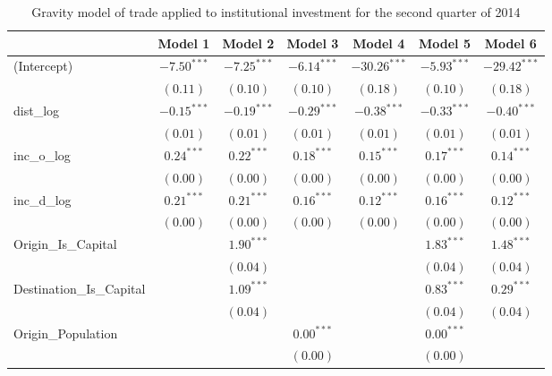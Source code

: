 \begin{table}
	\small
	\begin{center}
		\caption[Gravity Model of Trade for Q2 2014]{Gravity model of trade applied to institutional investment for the second quarter of 2014}
		
		\begin{tabular}{l c c c c c c }
			\hline
			& Model 1 & Model 2 & Model 3 & Model 4 & Model 5 & Model 6 \\
			\hline
			(Intercept)                  & $-7.50^{***}$ & $-7.25^{***}$ & $-6.14^{***}$ & $-30.26^{***}$ & $-5.93^{***}$ & $-29.42^{***}$ \\
			& $(0.11)$      & $(0.10)$      & $(0.10)$      & $(0.18)$       & $(0.10)$      & $(0.18)$       \\
			dist\_log                    & $-0.15^{***}$ & $-0.19^{***}$ & $-0.29^{***}$ & $-0.38^{***}$  & $-0.33^{***}$ & $-0.40^{***}$  \\
			& $(0.01)$      & $(0.01)$      & $(0.01)$      & $(0.01)$       & $(0.01)$      & $(0.01)$       \\
			inc\_o\_log                  & $0.24^{***}$  & $0.22^{***}$  & $0.18^{***}$  & $0.15^{***}$   & $0.17^{***}$  & $0.14^{***}$   \\
			& $(0.00)$      & $(0.00)$      & $(0.00)$      & $(0.00)$       & $(0.00)$      & $(0.00)$       \\
			inc\_d\_log                  & $0.21^{***}$  & $0.21^{***}$  & $0.16^{***}$  & $0.12^{***}$   & $0.16^{***}$  & $0.12^{***}$   \\
			& $(0.00)$      & $(0.00)$      & $(0.00)$      & $(0.00)$       & $(0.00)$      & $(0.00)$       \\
			Origin\_Is\_Capital          &               & $1.90^{***}$  &               &                & $1.83^{***}$  & $1.48^{***}$   \\
			&               & $(0.04)$      &               &                & $(0.04)$      & $(0.04)$       \\
			Destination\_Is\_Capital     &               & $1.09^{***}$  &               &                & $0.83^{***}$  & $0.29^{***}$   \\
			&               & $(0.04)$      &               &                & $(0.04)$      & $(0.04)$       \\
			Origin\_Population           &               &               & $0.00^{***}$  &                & $0.00^{***}$  &                \\
			&               &               & $(0.00)$      &                & $(0.00)$      &                \\

\end{tabular}
\end{center}
\end{table}
